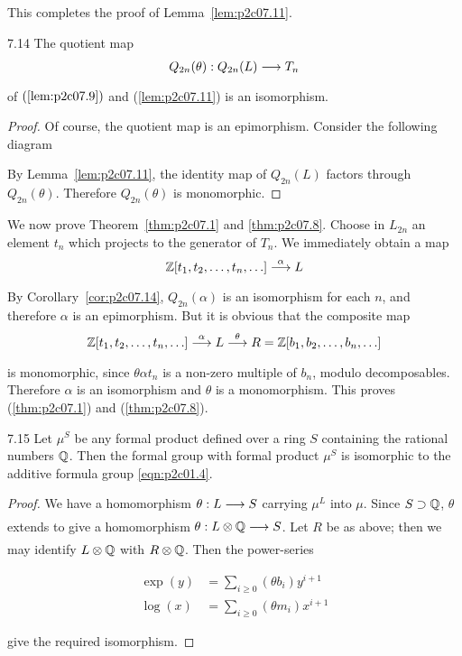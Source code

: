 \documentclass[../main]{subfiles}
\begin{document}
This completes the proof of Lemma~\ref{lem:p2c07.11}.

\begin{customcor}{7.14}
\label{cor:p2c07.14}
The quotient map \[Q_{2n}(\theta) : Q_{2n}(L) \lar{} T_n\] of $(\ref{lem:p2c07.9})$ and (\ref{lem:p2c07.11}) is an isomorphism. 
\end{customcor}

\begin{proof}
Of course, the quotient map is an epimorphism. Consider the following diagram

\begin{center}
\end{center}

By Lemma~\ref{lem:p2c07.11}, the identity map of $Q_{2n}(L)$ factors through $Q_{2n}(\theta)$. Therefore $Q_{2n}(\theta)$ is monomorphic.
\end{proof}

We now prove Theorem~\ref{thm:p2c07.1} and \ref{thm:p2c07.8}. Choose in $L_{2n}$ an element $t_n$ which projects to the generator of $T_n$. We immediately obtain a map \[\bbZ [t_1, t_2, \ldots, t_n, \ldots] \lar{\alpha} L\] By Corollary~\ref{cor:p2c07.14}, $Q_{2n}(\alpha)$ is an isomorphism for each $n$, and therefore $\alpha$ is an epimorphism. But it is obvious that the composite map \[\bbZ[t_1, t_2, \ldots, t_n, \ldots] \lar{\alpha} L \lar{\theta} R = \bbZ[b_1, b_2, \ldots, b_n, \ldots]\] is monomorphic, since $\theta \alpha t_n$ is a non-zero multiple of $b_n$, modulo decomposables. Therefore $\alpha$ is an isomorphism and $\theta$ is a monomorphism. This proves (\ref{thm:p2c07.1}) and (\ref{thm:p2c07.8}). 

\begin{customcor}{7.15}
\label{cor:p2c07.15}
Let $\mu^S$ be any formal product defined over a ring $S$ containing the rational numbers $\mathbb{Q}$. Then the formal group with formal product $\mu^S$ is isomorphic to the additive formula group \eqref{eqn:p2c01.4}.
\end{customcor}

\begin{proof}
We have a homomorphism $\theta : L \lar{} S$ carrying $\mu^L$ into $\mu$. Since $S \supset \mathbb{Q}$, $\theta$ extends to give a homomorphism $\theta : L \otimes \bbQ \lar{} S$. Let $R$ be as above; then we may identify $L \otimes \mathbb{Q}$ with $R \otimes \mathbb{Q}$. Then the power-series

\begin{align*}
\exp(y) & = \sum_{i \ge 0} (\theta b_i) y^{i + 1} \\ \log(x) & = \sum_{i \ge 0} (\theta m_i) x^{i + 1}
\end{align*}

give the required isomorphism.
\end{proof}
\end{document}
